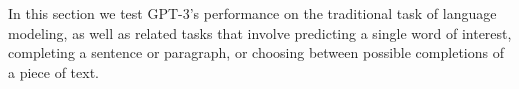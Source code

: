 In this section we test GPT-3’s performance on the traditional task of language modeling, as well as related tasks that involve predicting a single word of interest, completing a sentence or paragraph, or choosing between possible completions of a piece of text.